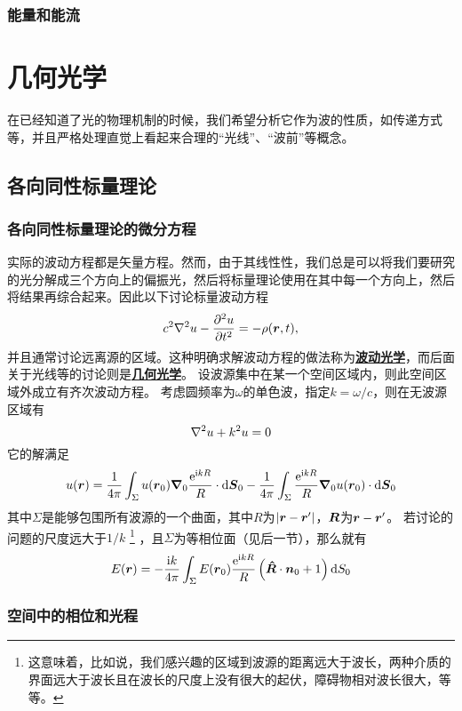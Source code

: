 \documentclass[UTF8, a4paper]{ctexart}
\newcommand*{\ii}{\mathrm{i}}
\newcommand*{\ee}{\mathrm{e}}
\newcommand*{\concept}[1]{\underline{\textbf{#1}}}
\begin{document}
\subsubsection{能量和能流}

\section{几何光学}

在已经知道了光的物理机制的时候，我们希望分析它作为波的性质，如传递方式等，并且严格处理直觉上看起来合理的“光线”、“波前”等概念。

\subsection{各向同性标量理论}\label{sec:isotropic-scalar}

\subsubsection{各向同性标量理论的微分方程}

实际的波动方程都是矢量方程。然而，由于其线性性，我们总是可以将我们要研究的光分解成三个方向上的偏振光，然后将标量理论使用在其中每一个方向上，然后将结果再综合起来。因此以下讨论标量波动方程
\[
    c^2 \laplacian u - \pdv[2]{u}{t} = - \rho(\vb*{r}, t),
\]
并且通常讨论远离源的区域。这种明确求解波动方程的做法称为\concept{波动光学}，而后面关于光线等的讨论则是\concept{几何光学}。
设波源集中在某一个空间区域内，则此空间区域外成立有齐次波动方程。
考虑圆频率为$\omega$的单色波，指定$k = \omega / c$，则在无波源区域有
\[
    \laplacian u + k^2 u = 0
\]
它的解满足
\[
    u(\vb*{r}) = 
    \frac{1}{4\pi} \int_{\Sigma} u(\vb*{r}_0) \grad_0{\frac{\ee^{\ii k R}}{R}} \cdot \dd \vb*{S}_0 
    - \frac{1}{4\pi} \int_{\Sigma} \frac{\ee^{\ii k R}}{R} \grad_0{u(\vb*{r}_0)} \cdot \dd{\vb*{S}_0}
\]
其中$\Sigma$是能够包围所有波源的一个曲面，其中$R$为$\abs{\vb*{r} - \vb*{r}'}$，$\vb*{R}$为$\vb*{r} - \vb*{r}'$。
若讨论的问题的尺度远大于$1/k$%
\footnote{这意味着，比如说，我们感兴趣的区域到波源的距离远大于波长，两种介质的界面远大于波长且在波长的尺度上没有很大的起伏，障碍物相对波长很大，等等。}
，且$\Sigma$为等相位面（见后一节），那么就有
\begin{equation}
    E(\vb*{r}) = - \frac{\ii k}{4\pi} \int_\Sigma E(\vb*{r}_0) \frac{\ee^{\ii k R}}{R} \left( \vu*{R} \cdot \vb*{n}_0 + 1 \right) \dd{S_0}
    \label{eq:kirchhoff-formula}
\end{equation}

\subsubsection{空间中的相位和光程}\label{sec:phrase-and-l}
\end{document}

